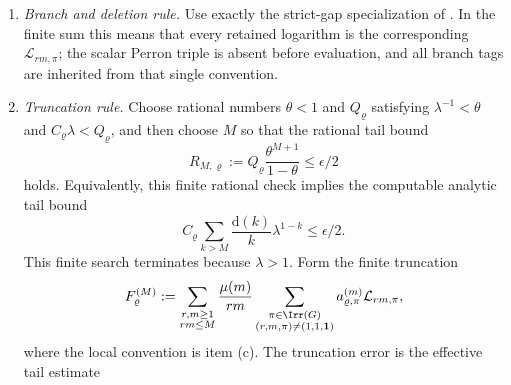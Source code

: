 \begin{lemma}
\begin{enumerate}[label=\textup{(\alph*)},leftmargin=*]
\begin{equation}
        a_{\varrho,\pi}^{(m)}
        =\bigl\langle \psi^m\chi_\varrho,\chi_\pi\bigr\rangle_G,
        \qquad
        (\psi^m\chi_\varrho)(g)=\chi_\varrho(g^m),
      \end{equation}
      by reducing \(m\) modulo \(\exp(G)\) and applying the finite
      character-table inner product.  These coefficients may be
      complex for non-real irreducible pairs; the final class constants are
      real by conjugation symmetry of the full character sum, not by termwise
      realness.
    \item \emph{Branch and deletion rule.}  Use exactly the strict-gap
      specialization of .  In
      the finite sum this means that every retained logarithm is the
      corresponding \(\mathcal L_{rm,\pi}\); the scalar Perron triple is
      absent before evaluation, and all branch tags are inherited from that
      single convention.
    \item \emph{Truncation rule.}  Choose rational numbers \(\theta<1\) and
      \(Q_\varrho\) satisfying \(\lambda^{-1}<\theta\) and
      \(C_\varrho\lambda<Q_\varrho\), and then choose \(M\) so that the rational
      tail bound
      \begin{equation}\label{eq:fixed-label-perron-finite-algorithm-rational-tail-choice}
        R_{M,\varrho}:=Q_\varrho\frac{\theta^{M+1}}{1-\theta}\le \epsilon/2
      \end{equation}
      holds.  Equivalently, this finite rational check implies the computable
      analytic tail bound
      \begin{equation}\label{eq:fixed-label-perron-finite-algorithm-tail-choice}
        C_\varrho
        \sum_{k>M}\frac{\mathrm d(k)}{k}\lambda^{1-k}
        \le \epsilon/2 .
      \end{equation}
      This finite search terminates because \(\lambda>1\).  Form the finite
      truncation
      \begin{equation}\label{eq:fixed-label-perron-finite-algorithm-truncation}
        F_\varrho^{(M)}
        :=
        \sum_{\substack{r,m\ge1\\rm\le M}}
        \frac{\mu(m)}{rm}
        \sum_{\substack{\pi\in\Irr(G)\\(r,m,\pi)\neq(1,1,\mathbf1)}}
          a_{\varrho,\pi}^{(m)}
          \mathcal L_{rm,\pi},
      \end{equation}
      where the local convention is item \textup{(c)}.  The truncation error
      is the effective tail estimate
      \begin{equation}\label{eq:fixed-label-perron-finite-algorithm-error}

\end{equation}
\end{enumerate}
\end{lemma}
